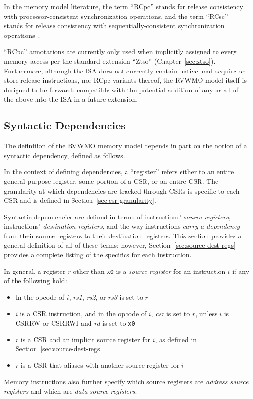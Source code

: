 \begin{commentary}
  In the memory model literature, the term ``RCpc'' stands for release consistency with processor-consistent synchronization operations, and the term ``RCsc'' stands for release consistency with sequentially-consistent synchronization operations~\cite{Gharachorloo90memoryconsistency}.

  ``RCpc'' annotations are currently only used when implicitly assigned to every memory access per the standard extension ``Ztso'' (Chapter~\ref{sec:ztso}).  Furthermore, although the ISA does not currently contain native load-acquire or store-release instructions, nor RCpc variants thereof, the RVWMO model itself is designed to be forwards-compatible with the potential addition of any or all of the above into the ISA in a future extension.
\end{commentary}

\subsection*{Syntactic Dependencies}
\label{sec:memorymodel:dependencies}
The definition of the RVWMO memory model depends in part on the notion of a syntactic dependency, defined as follows.

In the context of defining dependencies, a ``register'' refers either to an entire general-purpose register, some portion of a CSR, or an entire CSR.  The granularity at which dependencies are tracked through CSRs is specific to each CSR and is defined in Section~\ref{sec:csr-granularity}.

Syntactic dependencies are defined in terms of instructions' {\em source registers}, instructions' {\em destination registers}, and the way instructions {\em carry a dependency} from their source registers to their destination registers.
This section provides a general definition of all of these terms; however, Section~\ref{sec:source-dest-regs} provides a complete listing of the specifics for each instruction.

In general, a register $r$ other than {\tt x0} is a {\em source register} for an instruction $i$ if any of the following hold:
\begin{itemize}
  \item In the opcode of $i$, {\em rs1}, {\em rs2}, or {\em rs3} is set to $r$
  \item $i$ is a CSR instruction, and in the opcode of $i$, {\em csr} is set to $r$, unless $i$ is CSRRW or CSRRWI and {\em rd} is set to {\tt x0}
  \item $r$ is a CSR and an implicit source register for $i$, as defined in Section~\ref{sec:source-dest-regs}
  \item $r$ is a CSR that aliases with another source register for $i$
\end{itemize}
Memory instructions also further specify which source registers are {\em address source registers} and which are {\em data source registers}.


